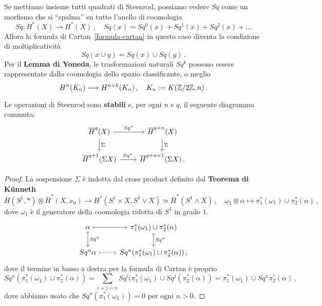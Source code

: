 Se mettiamo insieme tutti quadrati di Steenrod,
possiamo vedere $Sq$ come un morfismo che si ``spalma''
su tutto l'anello di coomologia
\begin{equation*}
	Sq : H^{*}(X) \longrightarrow H^{*}(X)\,, \quad
	Sq(x) = Sq^{0}(x) + Sq^{1}(x) + Sq^{2}(x) + \dots
\end{equation*}
Allora la formula di Cartan~\eqref{formula-cartan} in questo caso
diventa la condizione di moltiplicatività
\begin{equation*}
	Sq(x \cup y) = Sq(x) \cup Sq(y)\,.
\end{equation*}
Per il \textbf{Lemma di Yoneda}, le trasformazioni naturali
$Sq^{k}$ possono essere rappresentate dalla coomologia
dello spazio classificante, o meglio
\begin{equation*}
	H^{n}(K_{n}) \longrightarrow H^{n+k}(K_{n})\,, \quad K_{n} := K({\mathbb Z}/2{\mathbb Z},n)\,.
\end{equation*}

\begin{prop}
	Le operazioni di Steenrod sono \textbf{stabili} e, per ogni $n$ e $q$,
	il seguente diagramma commuta:
	\begin{equation*}
		\begin{tikzcd}
			\overline{H}^{q}(X) \ar[r, "Sq^{n}"] \ar[d, "\Sigma"]
			& \overline{H}^{q+n}(X) \ar[d, "\Sigma"] \\
			\overline{H}^{q+1}(\Sigma X) \ar[r, "Sq^{n}"]
			& \overline{H}^{q+n+1}(\Sigma X)\,.
		\end{tikzcd}
	\end{equation*}
	\begin{proof}
		La sospensione $\Sigma$ è indotta dal
		cross product definito dal \textbf{Teorema di Künneth}
		\begin{equation*}
			\overline{H}(S^{1},\ast) \otimes \overline{H}^{*}(X,x_{0})
			\longrightarrow H^{*}(S^{1} \times X, S^{1} \vee X) \simeq \overline{H}^{*}(S^{1} \wedge X)\,, 
			\quad \omega_{1} \otimes \alpha \longmapsto \pi_{1}^{*}(\omega_{1}) \cup \pi_{2}^{*}(\alpha)\,,
		\end{equation*}
		dove $\omega_{1}$ è il generatore della coomologia ridotta di $S^{1}$ in grado $1$.
		\begin{equation*}
			\begin{tikzcd}
				\alpha \ar[r, mapsto] \ar[d, mapsto, "Sq^{n}"]
				& \pi_{1}^{*}(\omega_{1}) \cup \pi_{2}^{*}(\alpha)
				\ar[d, mapsto, "Sq^{n}"] \\
				Sq^{n} \alpha \ar[r, mapsto, dashed]
				& Sq^{n}(\pi_{1}^{*}(\omega_{1}) \cup \pi_{2}^{*}(\alpha))\,,
			\end{tikzcd}
		\end{equation*}
		dove il termine in basso a destra per la formula di Cartan è proprio
		\begin{equation*}
			Sq^{n}(\pi_{1}^{*}(\omega_{1}) \cup \pi_{2}^{*}(\alpha))
			= \sum_{i+j=n} Sq^{i}(\pi_{1}^{*}(\omega_{1}) \cup Sq^{j}(\pi_{2}^{*}(\alpha))
			= \pi_{1}^{*}(\omega_{1}) \cup Sq^{n}\pi_{2}^{*}(\alpha)\,,
		\end{equation*}
		dove abbiamo usato che $Sq^{n}(\pi_{1}^{*}(\omega_{1}))=0$ per ogni $n > 0$.
	\end{proof}
\end{prop}

